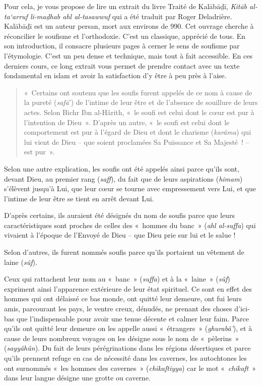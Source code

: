 Pour cela, je vous propose de lire un extrait du livre Traité de
Kalābāḏī, \emph{Kitāb al-ta`arruf li-maḏhab ahl al-tasawwuf} qui a été
traduit par Roger Deladrière\sn{~\textsc{Kalābāḏī}, \emph{Kitāb
  al-taʿarruf li-madhhab ahl al-taṣawwuf} {[}traduction française~:
  Traité de soufisme, Les Maîtres et les étapes, traduit de l'arabe et
  présenté par Roger Deladrière, Paris, Actes-Sud, Sinbad, 1981.}.
Kalābāḏī \label{theol:Kalabadi} est un auteur persan, mort aux environs de 990. Cet ouvrage
cherche à réconcilier le soufisme et l'orthodoxie. C'est un classique,
apprécié de tous. En son introduction, il consacre plusieurs pages à
cerner le sens de soufisme par l'étymologie. C'est un peu dense et
technique, mais tout à fait accessible. En ces derniers cours, ce long
extrait vous permet de prendre contact avec un texte fondamental en
islam et avoir la satisfaction d'y être à peu près à l'aise.
\begin{quote}
    

«~Certains ont soutenu que les soufis furent appelés de ce nom à cause
de la pureté (\emph{safā}') de l'intime de leur être et de l'absence de
souillure de leurs actes. Selon Bichr Ibn al-Hârith, «~le soufi est
celui dont le cœur est pur à l'intention de Dieu~». D'après un autre,
«~le soufi est celui dont le comportement est pur à l'égard de Dieu et
dont le charisme (\emph{karâma}) qui lui vient de Dieu -- que soient
proclamées Sa Puissance et Sa Majesté~! -- est pur~».
\end{quote}
Selon une autre explication, les soufis ont été appelés ainsi parce
qu'ils sont, devant Dieu, au premier rang (\emph{saff}), du fait que de
leurs aspirations (\emph{himam}) s'élèvent jusqu'à Lui, que leur cœur se
tourne avec empressement vers Lui, et que l'intime de leur être se tient
en arrêt devant Lui.

D'après certains, ils auraient été désignés du nom de soufis parce que
leurs caractéristiques sont proches de celles des «~hommes du banc~»
(\emph{ahl al-suffa}) qui vivaient à l'époque de l'Envoyé de Dieu -- que
Dieu prie sur lui et le salue !

Selon d'autres, ils furent nommés soufis parce qu'ils portaient un
vêtement de laine (\emph{sûf}).

Ceux qui rattachent leur nom au «~banc~» (\emph{suffa}) et à la
«~laine~» (\emph{sûf}) expriment ainsi l'apparence extérieure de leur
état spirituel. Ce sont en effet des hommes qui ont délaissé ce bas
monde, ont quitté leur demeure, ont fui leurs amis, parcourant les pays,
le ventre creux, dénudés, ne prenant des choses d'ici-bas que
l'indispensable pour avoir une tenue décente et calmer leur faim. Parce
qu'ils ont quitté leur demeure on les appelle aussi «~étrangers~»
(\emph{ghurabâ'}), et à cause de leurs nombreux voyages on les désigne
sous le nom de «~pèlerins~» (\emph{sayyâhûn}). Du fait de leurs
pérégrinations dans les régions désertiques et parce qu'ils prennent
refuge en cas de nécessité dans les cavernes, les autochtones les ont
surnommés «~les hommes des cavernes~» (\emph{chikaftiyya}) car le mot
«~\emph{chikaft}~» dans leur langue désigne une grotte ou caverne.

